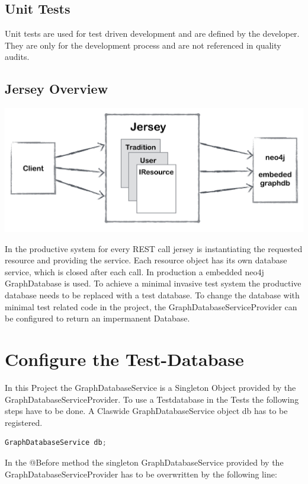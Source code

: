 \documentclass[11pt,fleqn,openany]{book} %
\begin{document}
\section*{Unit Tests}
Unit tests are used for test driven development and are defined by the developer. They are only for the development process and are not referenced in quality audits.

\newpage

\section*{Jersey Overview} 

\begin{center}
\includegraphics[scale=.40]{Pictures/jerseyoverview.png} 
\end{center}

In the productive system for every REST call jersey is instantiating the requested resource and providing the service. Each resource object has its own database service, which is closed after each call. In production a embedded neo4j GraphDatabase is used. To achieve a minimal invasive test system the productive database needs to be replaced with a test database. To change the database with minimal test related code in the project, the GraphDatabaseServiceProvider can be configured to return an impermanent Database.


\chapter{Configure the Test-Database}

In this Project the GraphDatabaseService is a Singleton Object provided by the GraphDatabaseServiceProvider. To use a Testdatabase in the Tests the following steps have to be done.
A Claswide GraphDatabaseService object db has to be registered.

\begin{lstlisting}[language=java]
    GraphDatabaseService db;
\end{lstlisting}
In the @Before method the singleton GraphDatabaseService provided by the GraphDatabaseServiceProvider has to be overwritten by the following line:
\end{document}
